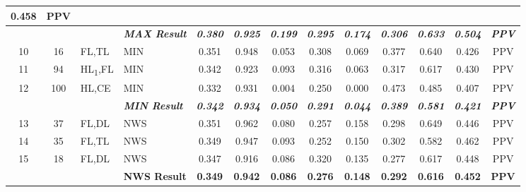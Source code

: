 \begin{table}[H]
{\begin{tabular}{ccl|l|c|c|c|c|c|c|c|c|c|}
    0.458 &
    PPV \\ \hline
  \textit{\textbf{}} &
    \textit{\textbf{}} &
    \textit{\textbf{}} &
    \textit{\textbf{MAX Result}} &
    \textit{\textbf{0.380}} &
    \textit{\textbf{0.925}} &
    \textit{\textbf{0.199}} &
    \textit{\textbf{0.295}} &
    \textit{\textbf{0.174}} &
    \textit{\textbf{0.306}} &
    \textit{\textbf{0.633}} &
    \textit{\textbf{0.504}} &
    \textit{\textbf{PPV}} \\ \hline
  \multicolumn{1}{|c|}{10} &
    \multicolumn{1}{c|}{16} &
    FL,TL &
    MIN &
    0.351 &
    0.948 &
    0.053 &
    0.308 &
    0.069 &
    0.377 &
    0.640 &
    0.426 &
    PPV \\ \hline
  \multicolumn{1}{|c|}{11} &
    \multicolumn{1}{c|}{94} &
    HL\textsubscript{1},FL &
    MIN &
    0.342 &
    0.923 &
    0.093 &
    0.316 &
    0.063 &
    0.317 &
    0.617 &
    0.430 &
    PPV \\ \hline
  \multicolumn{1}{|c|}{12} &
    \multicolumn{1}{c|}{100} &
    HL,CE &
    MIN &
    0.332 &
    0.931 &
    0.004 &
    0.250 &
    0.000 &
    0.473 &
    0.485 &
    0.407 &
    PPV \\ \hline
  \textit{\textbf{}} &
    \textit{\textbf{}} &
    \textit{\textbf{}} &
    \textit{\textbf{MIN Result}} &
    \textit{\textbf{0.342}} &
    \textit{\textbf{0.934}} &
    \textit{\textbf{0.050}} &
    \textit{\textbf{0.291}} &
    \textit{\textbf{0.044}} &
    \textit{\textbf{0.389}} &
    \textit{\textbf{0.581}} &
    \textit{\textbf{0.421}} &
    \textit{\textbf{PPV}} \\ \hline
  \multicolumn{1}{|c|}{13} &
    \multicolumn{1}{c|}{37} &
    FL,DL &
    NWS &
    0.351 &
    0.962 &
    0.080 &
    0.257 &
    0.158 &
    0.298 &
    0.649 &
    0.446 &
    PPV \\ \hline
  \multicolumn{1}{|c|}{14} &
    \multicolumn{1}{c|}{35} &
    FL,TL &
    NWS &
    0.349 &
    0.947 &
    0.093 &
    0.252 &
    0.150 &
    0.302 &
    0.582 &
    0.462 &
    PPV \\ \hline
  \multicolumn{1}{|c|}{15} &
    \multicolumn{1}{c|}{18} &
    FL,DL &
    NWS &
    0.347 &
    0.916 &
    0.086 &
    0.320 &
    0.135 &
    0.277 &
    0.617 &
    0.448 &
    PPV \\ \hline
  \textbf{} &
    \textbf{} &
    \textbf{} &
    \textbf{NWS Result} &
    \textbf{0.349} &
    \textbf{0.942} &
    \textbf{0.086} &
    \textbf{0.276} &
    \textbf{0.148} &
    \textbf{0.292} &
    \textbf{0.616} &
    \textbf{0.452} &
    \textbf{PPV} \\ \hline

\end{tabular}}
\end{table}

